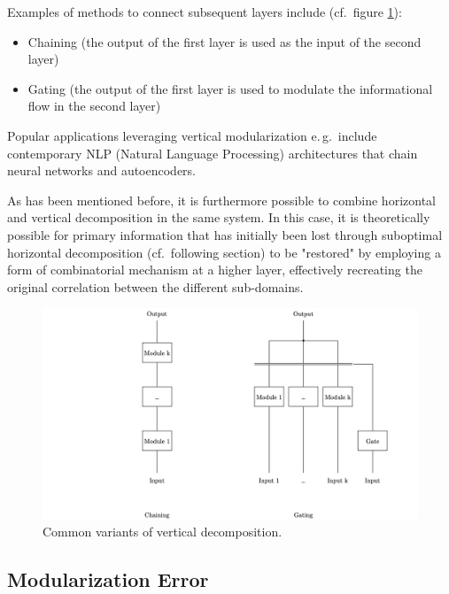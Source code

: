 Examples of methods to connect subsequent layers include (cf.\ figure \ref{fig:compnet_modularization_types_vertical_decomposition}):

\begin{itemize}
    \item Chaining (the output of the first layer is used as the input of the second layer)
    \item Gating (the output of the first layer is used to modulate the informational flow in the second layer)
\end{itemize}

Popular applications leveraging vertical modularization e.\,g.\ include contemporary NLP (Natural Language Processing) architectures that chain neural networks and autoencoders.

As has been mentioned before, it is furthermore possible to combine horizontal and vertical decomposition in the same system. In this case, it is theoretically possible for primary information that has initially been lost through suboptimal horizontal decomposition (cf.\ following section) to be "restored" by employing a form of combinatorial mechanism at a higher layer, effectively recreating the original correlation between the different sub-domains.

\begin{figure}[htb]
    \centering
	    \includegraphics[width=\textwidth, trim=150 0 150 0, clip]{thesis/graphics/graphics/vertical_decomposition.jpeg}
    \caption{Common variants of vertical decomposition.}
    \label{fig:compnet_modularization_types_vertical_decomposition}
\end{figure}

\subsection{Modularization Error%
            \label{sec:compnet_error}}


